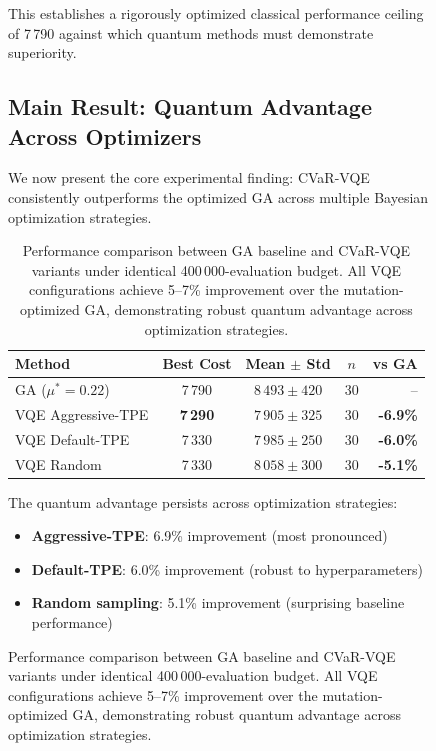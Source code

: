 \begin{figure}[htb]
This establishes a rigorously optimized classical performance ceiling of 7\,790 against which quantum methods must demonstrate superiority.

\subsection{Main Result: Quantum Advantage Across Optimizers}

We now present the core experimental finding: CVaR-VQE consistently outperforms the optimized GA across multiple Bayesian optimization strategies.


\begin{table}[htb]
    \centering
    \caption{Performance comparison between GA baseline and CVaR-VQE variants under identical 400\,000-evaluation budget. All VQE configurations achieve 5--7\% improvement over the mutation-optimized GA, demonstrating robust quantum advantage across optimization strategies.}
    \label{tab:main_results}
    \begin{tabular}{lcccr}
        \toprule
        Method & Best Cost & Mean $\pm$ Std & $n$ & vs GA \\
        \midrule
        GA ($\mu^* = 0.22$) & 7\,790 & $8\,493 \pm 420$ & 30 & -- \\
        VQE Aggressive-TPE & \textbf{7\,290} & $7\,905 \pm 325$ & 30 & \textbf{-6.9\%} \\
        VQE Default-TPE & 7\,330 & $7\,985 \pm 250$ & 30 & \textbf{-6.0\%} \\
        VQE Random & 7\,330 & $8\,058 \pm 300$ & 30 & \textbf{-5.1\%} \\
        \bottomrule
    \end{tabular}
\end{table}

The quantum advantage persists across optimization strategies:
\begin{itemize}[nosep]
    \item \textbf{Aggressive-TPE}: 6.9\% improvement (most pronounced)
    \item \textbf{Default-TPE}: 6.0\% improvement (robust to hyperparameters)  
    \item \textbf{Random sampling}: 5.1\% improvement (surprising baseline performance)
\end{itemize}


\end{figure}
